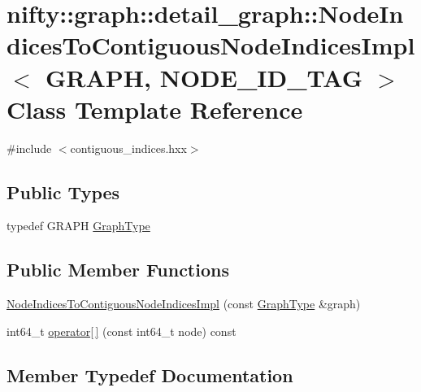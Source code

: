 \hypertarget{classnifty_1_1graph_1_1detail__graph_1_1NodeIndicesToContiguousNodeIndicesImpl}{}\section{nifty\+:\+:graph\+:\+:detail\+\_\+graph\+:\+:Node\+Indices\+To\+Contiguous\+Node\+Indices\+Impl$<$ G\+R\+A\+PH, N\+O\+D\+E\+\_\+\+I\+D\+\_\+\+T\+AG $>$ Class Template Reference}
\label{classnifty_1_1graph_1_1detail__graph_1_1NodeIndicesToContiguousNodeIndicesImpl}


{\ttfamily \#include $<$contiguous\+\_\+indices.\+hxx$>$}

\subsection*{Public Types}
\begin{DoxyCompactItemize}
\item 
typedef G\+R\+A\+PH \hyperlink{classnifty_1_1graph_1_1detail__graph_1_1NodeIndicesToContiguousNodeIndicesImpl_ad59d071f31d84046a821f0ddb406c21e}{Graph\+Type}
\end{DoxyCompactItemize}
\subsection*{Public Member Functions}
\begin{DoxyCompactItemize}
\item 
\hyperlink{classnifty_1_1graph_1_1detail__graph_1_1NodeIndicesToContiguousNodeIndicesImpl_a11cb2c2e77e50dab32081e1b42e0a6b4}{Node\+Indices\+To\+Contiguous\+Node\+Indices\+Impl} (const \hyperlink{classnifty_1_1graph_1_1detail__graph_1_1NodeIndicesToContiguousNodeIndicesImpl_ad59d071f31d84046a821f0ddb406c21e}{Graph\+Type} \&graph)
\item 
int64\+\_\+t \hyperlink{classnifty_1_1graph_1_1detail__graph_1_1NodeIndicesToContiguousNodeIndicesImpl_a38663dd0927fdf715d490f56b7fb3873}{operator\mbox{[}$\,$\mbox{]}} (const int64\+\_\+t node) const
\end{DoxyCompactItemize}


\subsection{Member Typedef Documentation}
\mbox{\label{classnifty_1_1graph_1_1detail__graph_1_1NodeIndicesToContiguousNodeIndicesImpl_ad59d071f31d84046a821f0ddb406c21e}} 
